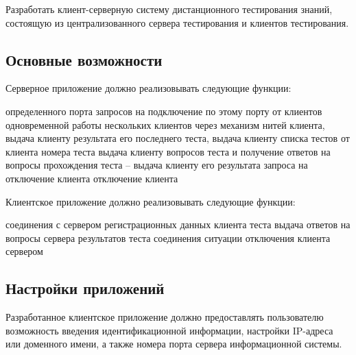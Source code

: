 Разработать клиент-серверную систему дистанционного тестирования знаний, состоящую из централизованного сервера тестирования и клиентов тестирования.

\subsection{Основные возможности}

Серверное приложение должно реализовывать следующие функции:
\vspace{5mm}

\begin{enumerate}
 определенного порта
 запросов на подключение по этому порту от клиентов
 одновременной работы нескольких клиентов через механизм нитей
 клиента, выдача клиенту результата его последнего теста, выдача клиенту списка тестов
 от клиента номера теста
 выдача клиенту вопросов теста и получение ответов на вопросы
 прохождения теста – выдача клиенту его результата
 запроса на отключение клиента
 отключение клиента
\end{enumerate}

\vspace{5mm}
Клиентское приложение должно реализовывать следующие функции:
\vspace{5mm}

\begin{enumerate}
 соединения с сервером
 регистрационных данных клиента
 теста
 выдача ответов на вопросы сервера
 результатов теста
 соединения
 ситуации отключения клиента сервером
\end{enumerate}

\vspace{5mm}

\subsection{Настройки приложений}

\vspace{5mm}

Разработанное клиентское приложение должно предоставлять пользователю возможность введения идентификационной информации, настройки IP-адреса или доменного имени, а также номера порта сервера информационной системы.

\vspace{5mm}


